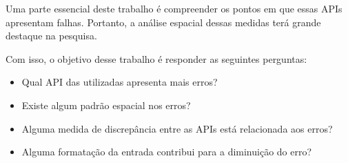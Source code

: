 Uma parte essencial deste trabalho é compreender os pontos em que essas APIs apresentam falhas. Portanto, a análise espacial dessas medidas terá grande destaque na pesquisa.

Com isso, o objetivo desse trabalho é responder as seguintes perguntas:
\begin{itemize}
   \item Qual API das utilizadas apresenta mais erros?
   \item Existe algum padrão espacial nos erros?
   \item Alguma medida de discrepância entre as APIs está relacionada aos erros?
   \item Alguma formatação da entrada contribui para a diminuição do erro?
\end{itemize}



